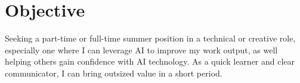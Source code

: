 \documentclass[letterpaper]{twentysecondcv} %
\begin{document}





\skillstext{}


\makeprofile %


\section{Objective}


Seeking a part-time or full-time summer position in a technical or creative role, especially one where I can leverage AI to improve my work output, as well helping others gain confidence with AI technology.  As a quick learner and clear communicator, I can bring outsized value in a short period.


   

\vspace{32pt} %
\end{document}
